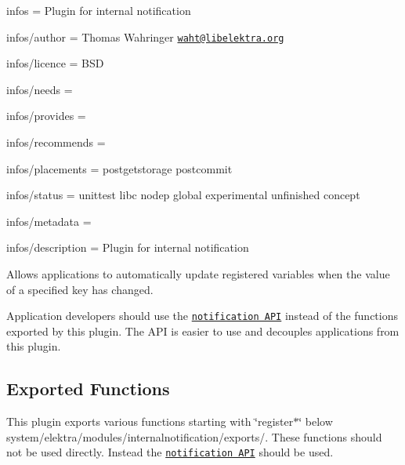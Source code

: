
\begin{DoxyItemize}
\item infos = Plugin for internal notification
\item infos/author = Thomas Wahringer \href{mailto:waht@libelektra.org}{\tt waht@libelektra.\+org}
\item infos/licence = B\+SD
\item infos/needs =
\item infos/provides =
\item infos/recommends =
\item infos/placements = postgetstorage postcommit
\item infos/status = unittest libc nodep global experimental unfinished concept
\item infos/metadata =
\item infos/description = Plugin for internal notification
\end{DoxyItemize}

Allows applications to automatically update registered variables when the value of a specified key has changed.

Application developers should use the \href{https://doc.libelektra.org/api/current/html/group__kdbnotification.html}{\tt notification A\+PI} instead of the functions exported by this plugin. The A\+PI is easier to use and decouples applications from this plugin.

\subsection*{Exported Functions}

This plugin exports various functions starting with \char`\"{}register$\ast$\char`\"{} below {\ttfamily system/elektra/modules/internalnotification/exports/}. These functions should not be used directly. Instead the \href{https://doc.libelektra.org/api/current/html/group__kdbnotification.html}{\tt notification A\+PI} should be used. 